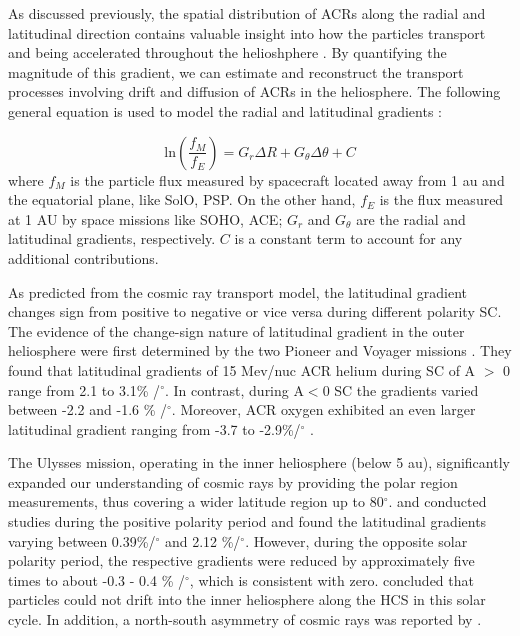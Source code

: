 As discussed previously, the spatial distribution of \acp{ACR} along the radial and latitudinal direction contains valuable insight into how the particles transport and being accelerated throughout the helioshphere \citep{Rankin2021ApJ}. By quantifying the magnitude of this gradient, we can estimate and reconstruct the transport processes involving drift and diffusion of \acp{ACR} in the heliosphere. The following general equation is used to model the radial and latitudinal gradients \citep{Vos2016SoPh}:

\begin{equation}
	\mathrm{ln}(\frac{f_{M}}{f_{E}}) = G_r \Delta R  + G_{\theta} \Delta \theta + C
\end{equation}
where $f_{M}$ is the particle flux measured by spacecraft located away from 1 au and the equatorial plane, like \ac{SolO}, \ac{PSP}. On the other hand, $f_{E}$ is the flux measured at 1 AU by space missions like \ac{SOHO}, \ac{ACE}; $G_r$ and $G_{\theta}$ are the radial and latitudinal gradients, respectively. $C$ is a constant term to account for any additional contributions.


As predicted from the cosmic ray transport model, the latitudinal gradient changes sign from positive to negative or vice versa during different polarity \ac{SC}. The evidence of the change-sign nature of latitudinal gradient in the outer heliosphere were first determined by the two Pioneer and Voyager missions \citep{Mckibben1979ApJ, Cummings1987GeoRL, Christon1986JGR}. They found that latitudinal gradients of 15 Mev/nuc \ac{ACR} helium during \ac{SC} of A $>$ 0 range from 2.1 to 3.1\% /$^\circ$. In contrast, during A$<$0 \ac{SC} the gradients varied between -2.2 and -1.6 \% /$^\circ$. Moreover, \ac{ACR} oxygen exhibited an even larger latitudinal gradient ranging from -3.7 to -2.9\%/$^\circ$ \citep{Cummings1987GeoRL}.

The Ulysses mission, operating in the inner heliosphere (below 5 au), significantly expanded our understanding of cosmic rays by providing the polar region measurements, thus covering a wider latitude region up to 80$^\circ$. \citet{Lanzerotti1995GeoRL} and \citet{Heber1998JGR} conducted studies during the positive polarity period and found the latitudinal gradients varying between 0.39\%/$^\circ$ and 2.12 \%/$^\circ$. However, during the opposite solar polarity period, the respective gradients were reduced by approximately five times to about -0.3 - 0.4 \% /$^\circ$, which is consistent with zero. \citet{Cummings2009GeoRL} concluded that particles could not drift into the inner heliosphere along the \ac{HCS} in this solar cycle. In addition, a north-south asymmetry of cosmic rays was reported by \citet{Simpson1996ApJ}.


